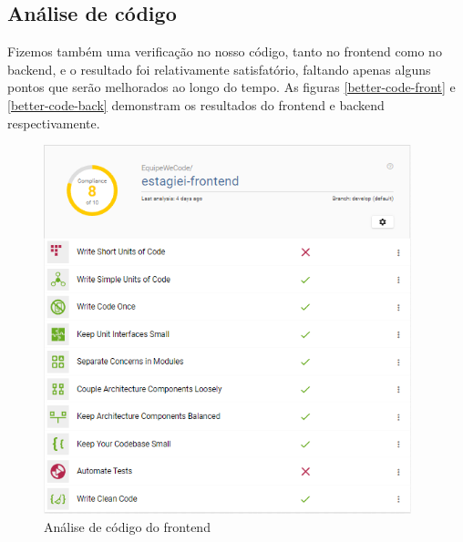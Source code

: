 \subsection{Análise de código}
Fizemos também uma verificação no nosso código, tanto no \gls{frontend} como no \gls{backend}, e o resultado foi relativamente satisfatório, faltando apenas alguns pontos que serão melhorados ao longo do tempo. As figuras \autoref{better-code-front} e \autoref{better-code-back} demonstram os resultados do \gls{frontend} e \gls{backend} respectivamente.

\begin{figure}[H]
	\centering
	\caption{\label{better-code-front}Análise de código do \gls{frontend}}
	\includegraphics[width=0.95\textwidth]{../imagens/web-tests/better-code-front.png}
\end{figure}


